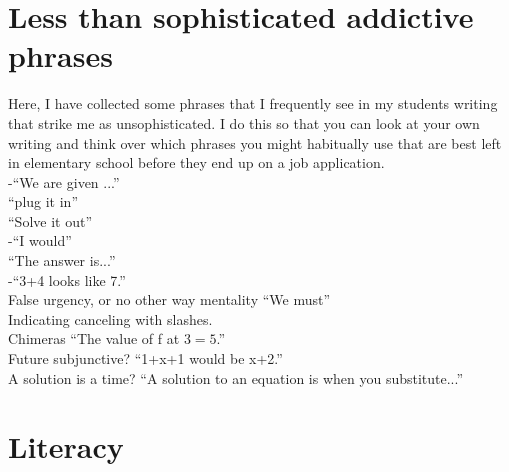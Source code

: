\documentclass[12pt]{article}
\def\noi{\noindent}
\begin{document}
%




\section{Less than sophisticated addictive phrases}
Here, I have collected some phrases that I frequently see in my students writing that strike me as unsophisticated. 
I do this so that you can look at your own writing and think over which phrases you might habitually use that are best left in elementary school before they end up on a job application. 
\\[1cm]

\noindent 
-``We are given ...''\\
``plug it in''\\
``Solve it out''\\
-``I would'' \\
``The answer is...''\\
-``3+4 looks like 7.''\\
False urgency, or no other way mentality ``We must''\\
Indicating canceling with slashes.\\
Chimeras ``The value of f at $3= 5$.''\\
Future subjunctive? ``1+x+1 would be x+2.'' \\
A solution is a time? ``A solution to an equation is when you substitute...''  \\ 



\section{Literacy }


%
%
\end{document}

